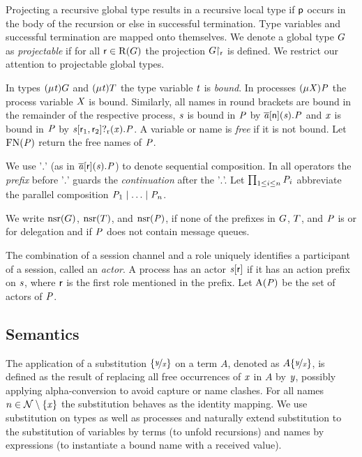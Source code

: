 Projecting a recursive global type results in a recursive local type if $ \Role[p] $ occurs in the body of the recursion or else in successful termination.
Type variables and successful termination are mapped onto themselves.
We denote a global type $ \GT $ as \emph{projectable} if for all $ \Role \in \Roles{\GT} $ the projection $ \Proj{\GT}{\Role} $ is defined.
We restrict our attention to projectable global types.

In types $ \GRep{\TypeV}{\GT} $ and $ \LRep{\TypeV}{\LT} $ the type variable $ \TypeV $ is \emph{bound}.
In processes $ \PRep{\ProcV}{\PT} $ the process variable $ \ProcV $ is bound.
Similarly, all names in round brackets are bound in the remainder of the respective process, \eg $ \Chan $ is bound in $ \PT $ by $ \PReq{\Chan[a]}{\Role[n]}{\Chan}{\PT} $ and $ \Args $ is bound in $ \PT $ by $ \PGetR{\Chan}{\Role_1}{\Role_2}{\Args}{\PT} $.
A variable or name is \emph{free} if it is not bound. Let $ \FreeNames{\PT} $ return the free names of $ \PT $.

We use '$. $' (as \eg in $ \PReq{\Chan[a]}{\Role}{\Chan}{\PT} $) to denote sequential composition. In all operators the \emph{prefix} before '$. $' guards the \emph{continuation} after the '$. $'.
Let $ \prod_{1 \leq i \leq n} \PT_i $ abbreviate the parallel composition $ \PPar{\PT_1}{\PPar{\ldots}{\PT_n}} $.

We write  $ \Unreliable{\GT} $, $ \Unreliable{\LT} $, and $ \Unreliable{\PT} $, if none of the prefixes in $ \GT $, $ \LT $, and $ \PT $ is \strongR or for delegation and if $ \PT $ does not contain message queues.

The combination of a session channel and a role uniquely identifies a participant of a session, called an \emph{actor}. A process has an actor $ \AT{\Chan[s]}{\Role} $ if it has an action prefix on $ \Chan $, where $ \Role $ is the first role mentioned in the prefix.
Let $ \Actors{\PT} $ be the set of actors of $ \PT $.

\subsection{Semantics} %

The application of a substitution $ \Subst{\Args[y]}{\Args} $ on a term $ A $, denoted as $ A\Subst{\Args[y]}{\Args} $, is defined as the result of replacing all free occurrences of $ \Args $ in $ A $ by $ \Args[y] $, possibly applying alpha-conversion to avoid capture or name clashes. For all names $ n \in \names \setminus \Set{ \Args } $ the substitution behaves as the identity mapping. We use substitution on types as well as processes and naturally extend substitution to the substitution of variables by terms (to unfold recursions) and names by expressions (to instantiate a bound name with a received value).

